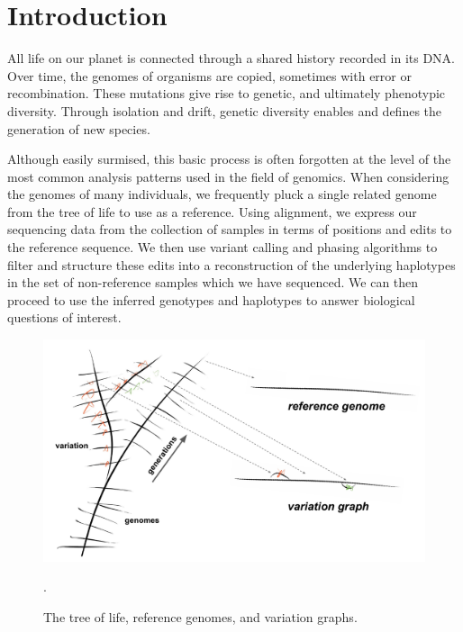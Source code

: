 
\chapter{Introduction}  %

\ifpdf
    \graphicspath{{Chapter1/Figs/Raster/}{Chapter1/Figs/PDF/}{Chapter1/Figs/}}
\else
    \graphicspath{{Chapter1/Figs/Vector/}{Chapter1/Figs/}}
\fi


All life on our planet is connected through a shared history recorded in its DNA.
Over time, the genomes of organisms are copied, sometimes with error or recombination.
These mutations give rise to genetic, and ultimately phenotypic diversity.
Through isolation and drift, genetic diversity enables and defines the generation of new species.

Although easily surmised, this basic process is often forgotten at the level of the most common analysis patterns used in the field of genomics.
When considering the genomes of many individuals, we frequently pluck a single related genome from the tree of life to use as a reference.
Using alignment, we express our sequencing data from the collection of samples in terms of positions and edits to the reference sequence.
We then use variant calling and phasing algorithms to filter and structure these edits into a reconstruction of the underlying haplotypes in the set of non-reference samples which we have sequenced.
We can then proceed to use the inferred genotypes and haplotypes to answer biological questions of interest.

\begin{figure}[htbp!]
  \centering
  \includegraphics[width=1.0\textwidth]{Chapter1/Figs/phylogeny_and_vg.pdf}
  \caption{
    The tree of life, reference genomes, and variation graphs.
    } 
\label{fig:pangenomic_processes}.
\end{figure}

